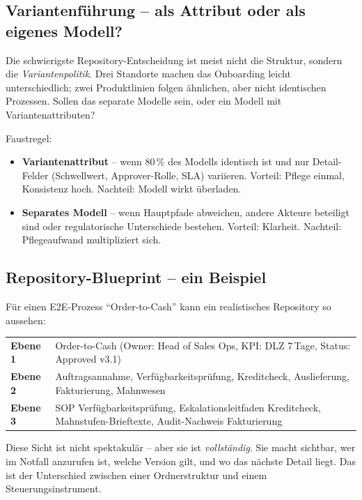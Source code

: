 \documentclass[11pt,a4paper,oneside]{article}
\begin{document}
\subsection{Variantenführung -- als Attribut oder als eigenes Modell?}

Die schwierigste Repository-Entscheidung ist meist nicht die Struktur, sondern die \emph{Variantenpolitik}. Drei Standorte machen das Onboarding leicht unterschiedlich; zwei Produktlinien folgen ähnlichen, aber nicht identischen Prozessen. Sollen das separate Modelle sein, oder ein Modell mit Variantenattributen?

Faustregel:
\begin{itemize}
  \item \textbf{Variantenattribut} -- wenn 80\,\% des Modells identisch ist und nur Detail-Felder (Schwellwert, Approver-Rolle, SLA) variieren. Vorteil: Pflege einmal, Konsistenz hoch. Nachteil: Modell wirkt überladen.
  \item \textbf{Separates Modell} -- wenn Hauptpfade abweichen, andere Akteure beteiligt sind oder regulatorische Unterschiede bestehen. Vorteil: Klarheit. Nachteil: Pflegeaufwand multipliziert sich.
\end{itemize}

\subsection{Repository-Blueprint -- ein Beispiel}

Für einen E2E-Prozess ``Order-to-Cash'' kann ein realistisches Repository so aussehen:

\begin{tabularx}{\linewidth}{@{}>{\bfseries}lX@{}}
\toprule
Ebene 1 & Order-to-Cash (Owner: Head of Sales Ops, KPI: DLZ 7\,Tage, Status: Approved v3.1) \\
Ebene 2 & Auftragsannahme, Verfügbarkeitsprüfung, Kreditcheck, Auslieferung, Fakturierung, Mahnwesen \\
Ebene 3 & SOP Verfügbarkeitsprüfung, Eskalationsleitfaden Kreditcheck, Mahnstufen-Brieftexte, Audit-Nachweis Fakturierung \\
\bottomrule
\end{tabularx}

\medskip

\noindent Diese Sicht ist nicht spektakulär -- aber sie ist \emph{vollständig}. Sie macht sichtbar, wer im Notfall anzurufen ist, welche Version gilt, und wo das nächste Detail liegt. Das ist der Unterschied zwischen einer Ordnerstruktur und einem Steuerungsinstrument.
\end{document}
